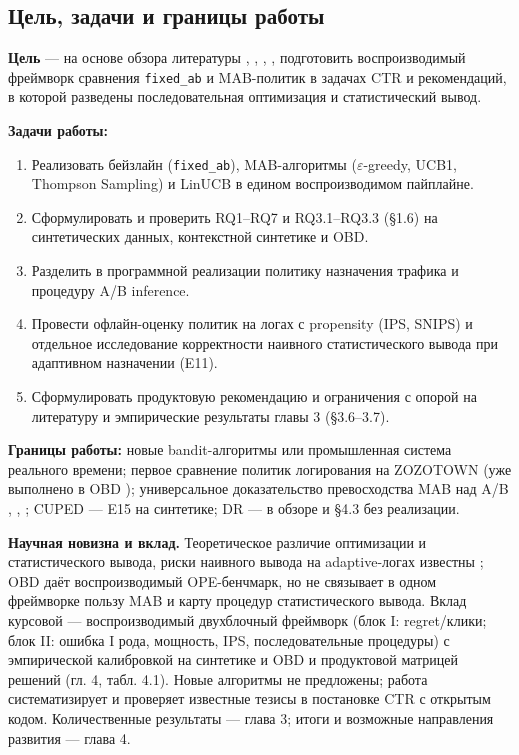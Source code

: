 \subsection{Цель, задачи и границы работы}\label{ux446ux435ux43bux44c-ux437ux430ux434ux430ux447ux438-ux438-ux433ux440ux430ux43dux438ux446ux44b-ux440ux430ux431ux43eux442ux44b}

\textbf{Цель} --- на основе обзора литературы \cite{ref12}, \cite{ref13}, \cite{ref18}, \cite{ref21}, \cite{ref22} подготовить воспроизводимый фреймворк сравнения \texttt{fixed\_ab} и MAB-политик в задачах CTR и рекомендаций, в которой разведены последовательная оптимизация и статистический вывод.

\textbf{Задачи работы:}

\begin{enumerate}
\def\labelenumi{\arabic{enumi}.}
\tightlist
\item
  Реализовать бейзлайн (\texttt{fixed\_ab}), MAB-алгоритмы ($\varepsilon$-greedy, UCB1, Thompson Sampling) и LinUCB в едином воспроизводимом пайплайне.
\item
  Сформулировать и проверить RQ1--RQ7 и RQ3.1--RQ3.3 (§1.6) на синтетических данных, контекстной синтетике и OBD.
\item
  Разделить в программной реализации политику назначения трафика и процедуру A/B inference.
\item
  Провести офлайн-оценку политик на логах с propensity (IPS, SNIPS) и отдельное исследование корректности наивного статистического вывода при адаптивном назначении (E11).
\item
  Сформулировать продуктовую рекомендацию и ограничения с опорой на литературу и эмпирические результаты главы 3 (§3.6--3.7).
\end{enumerate}

\textbf{Границы работы:} новые bandit-алгоритмы или промышленная система реального времени; первое сравнение политик логирования на ZOZOTOWN (уже выполнено в OBD \cite{ref26}); универсальное доказательство превосходства MAB над A/B \cite{ref18}, \cite{ref21}, \cite{ref22}; CUPED \cite{ref7} --- E15 на синтетике; DR \cite{ref27} --- в обзоре и §4.3 без реализации.

\textbf{Научная новизна и вклад.} Теоретическое различие оптимизации и статистического вывода, риски наивного вывода на adaptive-логах известны \cite{ref5,ref13,ref19,ref21}; OBD \cite{ref26} даёт воспроизводимый OPE-бенчмарк, но не связывает в одном фреймворке пользу MAB и карту процедур статистического вывода. Вклад курсовой --- воспроизводимый двухблочный фреймворк (блок I: regret/клики; блок II: ошибка I рода, мощность, IPS, последовательные процедуры) с эмпирической калибровкой на синтетике и OBD и продуктовой матрицей решений (гл. 4, табл. 4.1). Новые алгоритмы не предложены; работа систематизирует и проверяет известные тезисы в постановке CTR с открытым кодом. Количественные результаты --- глава 3; итоги и возможные направления развития --- глава 4.

